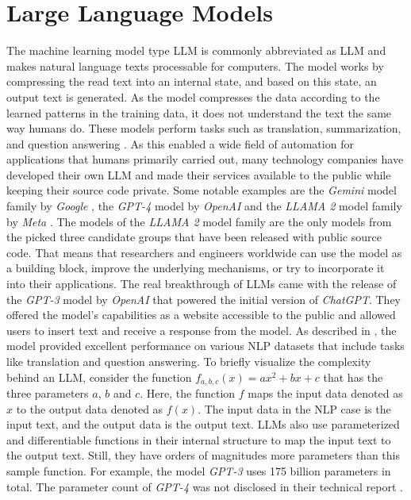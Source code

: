 \documentclass[draft,final]{thesisclass} %
\begin{document}
\section{Large Language Models}
The machine learning model type \gls{LLM} is commonly abbreviated as \acs{LLM} and makes natural language texts processable for computers.
The model works by compressing the read text into an internal state, and based on this state, an output text is generated.
As the model compresses the data according to the learned patterns in the training data, it does not understand the text the same way humans do.
These models perform tasks such as translation, summarization, and question answering \parencite[1]{llm_literature_review}.
As this enabled a wide field of automation for applications that humans primarily carried out, many technology companies have developed their own \acs{LLM} and made their services available to the public while keeping their source code private.
Some notable examples are the \textit{Gemini} model family by \textit{Google} \parencite{gemini}, the \textit{GPT-4} model by \textit{OpenAI} \parencite{gpt4} and the \textit{LLAMA 2} model family by \textit{Meta} \parencite{llama2}.
The models of the \textit{LLAMA 2} model family are the only models from the picked three candidate groups that have been released with public source code.
That means that researchers and engineers worldwide can use the model as a building block, improve the underlying mechanisms, or try to incorporate it into their applications.
The real breakthrough of \acs{LLM}s came with the release of the \textit{GPT-3} model by \textit{OpenAI} \parencite{gpt3} that powered the initial version of \textit{ChatGPT}.
They offered the model's capabilities as a website accessible to the public and allowed users to insert text and receive a response from the model.
As described in \textcite[1]{gpt3}, the model provided excellent performance on various \acs{NLP} datasets that include tasks like translation and question answering.
To briefly visualize the complexity behind an \acs{LLM}, consider the function $f_{a,b,c}(x) = ax^2+bx+c$ that has the three parameters $a$, $b$ and $c$.
Here, the function $f$ maps the input data denoted as $x$ to the output data denoted as $f(x)$.
The input data in the \acs{NLP} case is the input text, and the output data is the output text.
\acs{LLM}s also use parameterized and differentiable functions in their internal structure to map the input text to the output text. Still, they have orders of magnitudes more parameters than this sample function.
For example, the model \textit{GPT-3} uses 175 billion parameters \parencite[1]{gpt3} in total. The parameter count of \textit{GPT-4} was not disclosed in their technical report \parencite{gpt4}.
\end{document}
